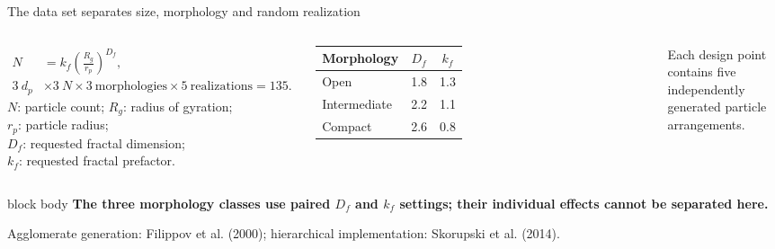 \documentclass[aspectratio=169,11pt]{beamer}
\newcommand{\takeaway}[1]{%
	\begin{beamercolorbox}[rounded=true,sep=.55em]{block body}
		\centering\color{tumdark}\textbf{#1}
\end{beamercolorbox}}
\newcommand{\slidesource}[1]{\par\vfill{\tiny\color{tumgray}#1}}
\begin{document}
\begin{frame}{The data set separates size, morphology and random realization}
  \begin{columns}[c,onlytextwidth]
      \begin{align*}
        N &= k_f\left(\frac{R_g}{r_p}\right)^{D_f},\\[.3em]
        3\ d_p &\times 3\ N \times 3\ \text{morphologies}
        \times 5\ \text{realizations}=135.
      \end{align*}
      \small
      $N$: particle count; $R_g$: radius of gyration;\\ $r_p$: particle radius;\\
      $D_f$: requested fractal dimension;\\ $k_f$: requested fractal prefactor.
      \begin{table}
        \centering\small
        \begin{tabular}{lcc}
          \toprule
          Morphology & $D_f$ & $k_f$\\
          \midrule
          Open & 1.8 & 1.3\\
          Intermediate & 2.2 & 1.1\\
          Compact & 2.6 & 0.8\\
          \bottomrule
        \end{tabular}
      \end{table}
      \vspace{.2cm}
      \small Each design point contains five \\ independently generated particle arrangements.
  \end{columns}
  \vspace{.3cm}
  \takeaway{The three morphology classes use paired $D_f$ and $k_f$ settings; their individual effects cannot be separated here.}
  \slidesource{Agglomerate generation: Filippov et al. (2000); hierarchical implementation: Skorupski et al. (2014).}
\end{frame}
\end{document}
